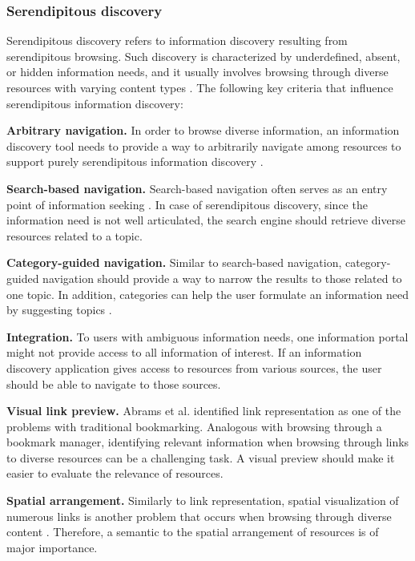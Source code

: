 \documentclass{casconpaper}
\begin{document}
{\subsubsection{Serendipitous discovery}
Serendipitous discovery refers to information discovery resulting from serendipitous  browsing. Such discovery is characterized by underdefined, absent, or hidden information needs, and it usually involves browsing through diverse resources with varying content types \cite{kellar2006, kellar2007}. The following key criteria that influence serendipitous information discovery:

\textbf{Arbitrary navigation.} In order to browse diverse information, an information discovery tool needs to provide a way to arbitrarily navigate among resources to support purely serendipitous information discovery \cite{foster}.

\textbf{Search-based navigation.} Search-based navigation often serves as an entry point of information seeking \cite{levene}. In case of serendipitous discovery, since the information need is not well articulated, the search engine should retrieve diverse resources related to a topic.

\textbf{Category-guided navigation.} Similar to search-based navigation, category-guided navigation should provide a way to narrow the results to those related to one topic. In addition, categories can help the user formulate an information need by suggesting topics \cite{levene}.

\textbf{Integration.} To users with ambiguous information needs, one information portal might not provide access to all information of interest. If an information discovery application gives access to resources from various sources, the user should be able to navigate to those sources.

\textbf{Visual link preview.} Abrams et al. \cite{abrams} identified link representation as one of the problems with traditional bookmarking. Analogous with browsing through a bookmark manager, identifying relevant information when browsing through links to diverse resources can be a challenging task. A visual preview should make it easier to evaluate the relevance of resources.

\textbf{Spatial arrangement.} Similarly to link representation, spatial visualization of numerous links is another problem that occurs when browsing through diverse content \cite{abrams}. Therefore, a semantic to the spatial arrangement of resources is of major importance.



} %
\end{document}
